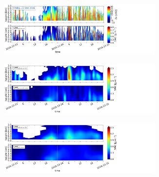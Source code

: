 \begin{figure}[t]
	\centering
    \begin{subfigure}[t]{\textwidth}
    \centering
    	\includegraphics[trim={0.cm 2.2cm 19.cm 0.5cm},clip,width=0.9\textwidth]{./fig_obs_ret/20161223}
		\caption{}\label{fig:SWC:ret_23}
    \end{subfigure}
    \begin{subfigure}[t]{\textwidth}
    \centering
    	\includegraphics[trim={0.cm 2.2cm 19.cm 0.5cm},clip,width=0.9\textwidth]{./fig_vert_SWC_EM/20161223}
		\caption{}\label{fig:SWC_EM:23}
    \end{subfigure}
    \begin{subfigure}[t]{\textwidth}
    \centering
    	\includegraphics[trim={0.cm 0.8cm 19.cm 0.5cm},clip,width=0.9\textwidth]{./fig_vert_SWC_3h/20161223}
		\caption{}\label{fig:SWC3h:23}
    \end{subfigure}
\end{figure}

